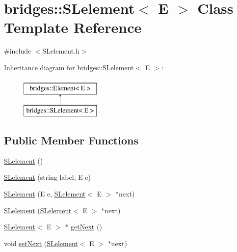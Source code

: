 \hypertarget{classbridges_1_1_s_lelement}{}\section{bridges\+:\+:S\+Lelement$<$ E $>$ Class Template Reference}
\label{classbridges_1_1_s_lelement}


{\ttfamily \#include $<$S\+Lelement.\+h$>$}

Inheritance diagram for bridges\+:\+:S\+Lelement$<$ E $>$\+:\begin{figure}[H]
\begin{center}
\leavevmode
\includegraphics[height=2.000000cm]{classbridges_1_1_s_lelement}
\end{center}
\end{figure}
\subsection*{Public Member Functions}
\begin{DoxyCompactItemize}
\item 
\hyperlink{classbridges_1_1_s_lelement_a3e6d801b38ff3b1c4d2f5af50c070064}{S\+Lelement} ()
\item 
\hyperlink{classbridges_1_1_s_lelement_a04f5aac53435b59ee78dedccd5ceb2c9}{S\+Lelement} (string label, E e)
\item 
\hyperlink{classbridges_1_1_s_lelement_a3b6c621cbe6d1f7226e445f0c27b29f4}{S\+Lelement} (E e, \hyperlink{classbridges_1_1_s_lelement}{S\+Lelement}$<$ E $>$ $\ast$next)
\item 
\hyperlink{classbridges_1_1_s_lelement_a1b5ef640621cc8071194b5ccd976e2eb}{S\+Lelement} (\hyperlink{classbridges_1_1_s_lelement}{S\+Lelement}$<$ E $>$ $\ast$next)
\item 
\hyperlink{classbridges_1_1_s_lelement}{S\+Lelement}$<$ E $>$ $\ast$ \hyperlink{classbridges_1_1_s_lelement_aa11794bee00e3573c2e28786d57697dc}{get\+Next} ()
\item 
void \hyperlink{classbridges_1_1_s_lelement_a1faf256441dc4c4b4776ae3530d24a28}{set\+Next} (\hyperlink{classbridges_1_1_s_lelement}{S\+Lelement}$<$ E $>$ $\ast$next)
\end{DoxyCompactItemize}


